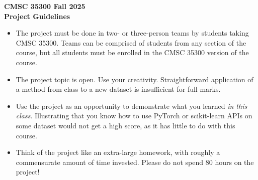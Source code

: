 \documentclass[11pt]{article}
\begin{document}
\begin{center} {\Large
{\bf CMSC 35300 Fall 2025} \\[2mm]
{\bf Project Guidelines}}
\end{center}
\vspace{0mm}

\begin{itemize}
\item The project must be done in two- or three-person teams by students taking CMSC 35300. Teams can be comprised of students from any section of the course, but all students must be enrolled in the CMSC 35300 version of the course.

\item The project topic is open.  Use your creativity.  Straightforward application of a method from class to a new dataset is insufficient for full marks.

\item Use the project as an opportunity to demonstrate what you learned {\em in this class}.  Illustrating that you know how to use PyTorch or scikit-learn APIs on some dataset would not get a high score, as it has little to do with this course.

\item Think of the project like an extra-large homework, with roughly a commensurate amount of time invested. Please do not spend 80 hours on the project!


\end{itemize}
\end{document}
